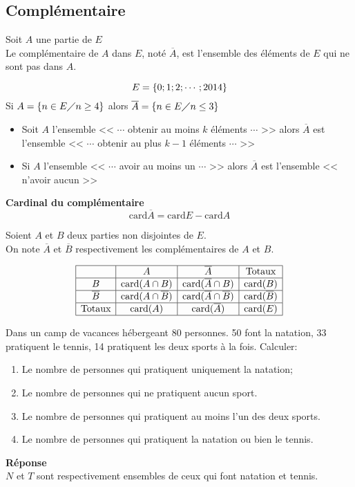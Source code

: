 \subsection*{Complémentaire}
Soit  $ A $ une partie de $ E $\\
 Le  complémentaire de $ A $ dans $ E $,  noté  $ \overline{A} $, est l'ensemble des éléments  de $ E $ qui ne sont pas dans $ A. $
\begin{example}
$$ E=\left\{0;1;2; \cdots ; 2014\right\} $$
Si $ A=\left\{n\in E \diagup n\geq 4\right\} $ alors  $ \overline{A}=\left\{n\in E \diagup n \leq 3\right\} $ 
\end{example}
\begin{remark}
\begin{itemize}
\item  Soit $ A $ l'ensemble << $\cdots$ obtenir au moins $k$ éléments $ \cdots $ >>  alors  $ \overline{A} $ est l'ensemble << $\cdots$ obtenir au plus $k-1$ éléments $ \cdots $ >>
\item  Si $ A $ l'ensemble << $\cdots$ avoir au moins un  $ \cdots $ >>  alors   $ \overline{A} $ est l'ensemble << n'avoir aucun >>
\end{itemize}
\end{remark}
\textbf{Cardinal du complémentaire}
\[ \textrm{card} \overline{A} = \textrm{card}E - \textrm{card}A \]

 Soient $ A$ et $B $ deux parties  non disjointes de $ E $.\\
On note $\overline{A} $ et  $\overline{B} $ respectivement les complémentaires de $ A$ et $B $.

$$
\begin{array}{|c|c|c|c|}
\hline
     & A & \overline{A} & \text{Totaux} \\
\hline
B & \text{card}(A \cap B) & \text{card}(\overline{A} \cap B) & \text{card}(B) \\
\hline
\overline{B} & \text{card}(A \cap \overline{B}) & \text{card}(\overline{A} \cap \overline{B}) & \text{card}(\overline{B}) \\
\hline
\text{Totaux} & \text{card}(A) & \text{card}(\overline{A}) & \text{card}(E) \\
\hline
\end{array}
$$



\begin{exercice}
Dans un camp de vacances hébergeant 80 personnes. 50 font la natation, 33 pratiquent le tennis, 14 pratiquent les deux sports à la fois. Calculer:
\begin{enumerate}
\item Le nombre de personnes qui pratiquent uniquement la natation;
\item Le nombre de personnes qui ne pratiquent aucun sport.
\item Le nombre de personnes qui pratiquent au moins l'un des deux sports.
\item  Le nombre de personnes qui pratiquent la natation ou bien le tennis.
\end{enumerate}
\end{exercice}
\textbf{Réponse}\\
$ N$ et $T $ sont respectivement ensembles de ceux qui font natation et tennis.

